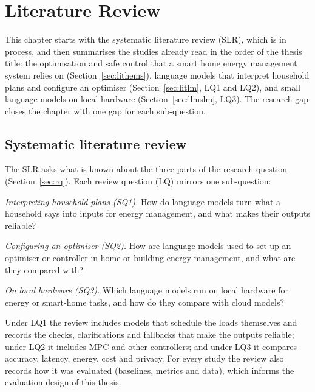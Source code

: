 \documentclass[12pt,a4paper]{report}
\begin{document}
\chapter{Literature Review}
\label{ch:lit}

This chapter starts with the systematic literature review (SLR), which
is in process, and then summarises the studies already read in the order
of the thesis title: the optimisation and safe control that a smart
home energy management system relies on (Section~\ref{sec:lithems}),
language models that interpret household plans and configure an
optimiser (Section~\ref{sec:litlm}, LQ1 and LQ2), and small language
models on local hardware (Section~\ref{sec:llmslm}, LQ3). The research
gap closes the chapter with one gap for each sub-question.

\section{Systematic literature review}
\label{sec:slrreview}

The SLR asks what is known about the three parts of the research
question (Section~\ref{sec:rq}). Each review question (LQ) mirrors one
sub-question:

\begin{description}[leftmargin=1.4cm, style=sameline, font=\normalfont\bfseries]
\item[LQ1] \textit{Interpreting household plans (SQ1).} How do language
models turn what a household says into inputs for energy management,
and what makes their outputs reliable?
\item[LQ2] \textit{Configuring an optimiser (SQ2).} How are language
models used to set up an optimiser or controller in home or building
energy management, and what are they compared with?
\item[LQ3] \textit{On local hardware (SQ3).} Which language models run on
local hardware for energy or smart-home tasks, and how do they compare
with cloud models?
\end{description}

Under LQ1 the review includes models that schedule the loads themselves
and records the checks, clarifications and fallbacks that make the
outputs reliable; under LQ2 it includes MPC and other controllers; and
under LQ3 it compares accuracy, latency, energy, cost and privacy. For
every study the review also records how it was evaluated (baselines,
metrics and data), which informs the evaluation design of this thesis.
\end{document}
